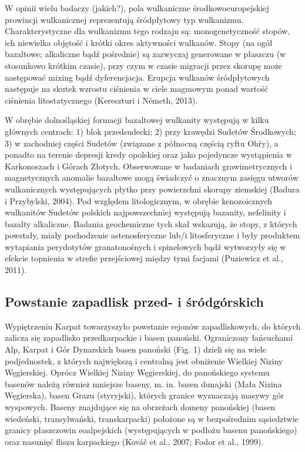 \documentclass[11.5pt,twoside]{report}
\begin{document}
W opinii wielu badaczy (jakich?), pola wulkaniczne środkowoeuropejskiej prowincji wulkanicznej reprezentują śródpłytowy typ wulkanizmu. Charakterystyczne dla wulkanizmu tego rodzaju są: monogenetyczność stopów, ich niewielka objętość i krótki okres aktywności wulkanów. Stopy (na ogół bazaltowe; alkaliczne bąd\'{z} pośrednie) są zazwyczaj generowane w płaszczu (w stosunkowo krótkim czasie), przy czym w czasie migracji przez skorupę może następować mixing bąd\'{z} dyferencjacja. Erupcja wulkanów śródpłytowych następuje na skutek wzrostu ciśnienia w ciele magmowym ponad wartość ciśnienia litostatycznego (Kereszturi i Németh, 2013). 

W obrębie dolnośląskiej formacji bazaltowej wulkanity występują w kilku głównych centrach: 1) blok przedsudecki; 2) przy krawędzi Sudetów Środkowych; 3) w zachodniej części Sudetów (związane z północną częścią ryftu Oh\v{r}y), a ponadto na terenie depresji kredy opolskiej oraz jako pojedyncze wystąpienia w Karkonoszach i Górach Złotych. Obserwowane w badaniach grawimetrycznych i magnetycznych anomalie bazaltowe mogą świadczyć o znacznym zasięgu utworów wulkanicznych występujących płytko przy powierzchni skorupy ziemskiej (Badura i Przybylski, 2004). Pod względem litologicznym, w obrębie kenozoicznych wulkanitów Sudetów polskich najpowszechniej występują bazanity, nefelinity i bazalty alkaliczne. Badania geochemiczne tych skał wskazują, że stopy, z których powstały, miały pochodzenie astenosferyczne lub/i litosferyczne i były produktem wytapiania perydotytów granatonośnych i spinelowych bąd\'{z} wytworzyły się w efekcie topnienia w strefie przejściowej między tymi facjami (Puziewicz et al., 2011).


  

	
	\subsection{Powstanie zapadlisk przed- i śródgórskich}
	
Wypiętrzeniu Karpat towarzyszyło powstanie rejonów zapadliskowych, do których zalicza się zapadlisko przedkarpackie i basen panoński. Ograniczony łańcuchami Alp, Karpat i Gór Dynarskich basen panoński (Fig. 1) dzieli się na wiele podjednostek, z których największą i centralną jest obniżenie Wielkiej Niziny Węgierskiej. Oprócz Wielkiej Niziny Węgierskiej, do panońskiego systemu basenów należą również mniejsze baseny, m. in. basen dunajski (Mała Nizina Węgierska), basen Grazu (styryjski), których granice wyznaczają masywy gór wyspowych. Baseny znajdujące się na obrzeżach domeny panońskiej (basen wiedeński, transylwański, transkarpacki) położone są w bezpośrednim sąsiedztwie granicy płaszczowin eoalpejskich (występujących w podłożu basenu panońskiego) oraz nasunięć fliszu karpackiego (Kováč et al., 2007; Fodor et al., 1999).
\end{document}
